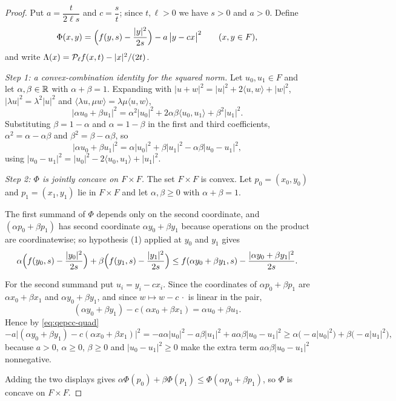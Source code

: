 \begin{proof}
Put $a=\dfrac{t}{2\ell s}$ and $c=\dfrac st$; since $t,\ell>0$ we have $s>0$ and $a>0$.
Define
\[
  \Phi(x,y)=\Bigl(f(y,s)-\frac{|y|^2}{2s}\Bigr)-a\,\bigl|y-cx\bigr|^2
  \qquad(x,y\in F),
\]
and write $\Lambda(x)=\mathcal{P}_\ell f(x,t)-|x|^2/(2t)$.

\emph{Step 1: a convex-combination identity for the squared norm.}
Let $u_0,u_1\in F$ and let $\alpha,\beta\in\mathbb{R}$ with $\alpha+\beta=1$. Expanding with
$|u+w|^2=|u|^2+2\langle u,w\rangle+|w|^2$, $|\lambda u|^2=\lambda^2|u|^2$ and
$\langle\lambda u,\mu w\rangle=\lambda\mu\langle u,w\rangle$,
\[
  |\alpha u_0+\beta u_1|^2
   =\alpha^2|u_0|^2+2\alpha\beta\langle u_0,u_1\rangle+\beta^2|u_1|^2 .
\]
Substituting $\beta=1-\alpha$ and $\alpha=1-\beta$ in the first and third coefficients,
$\alpha^2=\alpha-\alpha\beta$ and $\beta^2=\beta-\alpha\beta$, so
\begin{equation}\label{eq:qepcc-quad}
  |\alpha u_0+\beta u_1|^2
   =\alpha|u_0|^2+\beta|u_1|^2-\alpha\beta|u_0-u_1|^2 ,
\end{equation}
using $|u_0-u_1|^2=|u_0|^2-2\langle u_0,u_1\rangle+|u_1|^2$.

\emph{Step 2: $\Phi$ is jointly concave on $F\times F$.}
The set $F\times F$ is convex. Let $p_0=(x_0,y_0)$ and $p_1=(x_1,y_1)$ lie in $F\times F$
and let $\alpha,\beta\ge0$ with $\alpha+\beta=1$.

The first summand of $\Phi$ depends only on the second coordinate, and
$(\alpha p_0+\beta p_1)$ has second coordinate $\alpha y_0+\beta y_1$ because operations
on the product are coordinatewise; so hypothesis (1) applied at $y_0$ and $y_1$ gives
\[
  \alpha\Bigl(f(y_0,s)-\frac{|y_0|^2}{2s}\Bigr)+\beta\Bigl(f(y_1,s)-\frac{|y_1|^2}{2s}\Bigr)
   \le f(\alpha y_0+\beta y_1,s)-\frac{|\alpha y_0+\beta y_1|^2}{2s}.
\]

For the second summand put $u_i=y_i-cx_i$. Since the coordinates of
$\alpha p_0+\beta p_1$ are $\alpha x_0+\beta x_1$ and $\alpha y_0+\beta y_1$, and since
$w\mapsto w-c\,\cdot$ is linear in the pair,
\[
  (\alpha y_0+\beta y_1)-c(\alpha x_0+\beta x_1)=\alpha u_0+\beta u_1 .
\]
Hence by \eqref{eq:qepcc-quad}
\[
  -a\bigl|(\alpha y_0+\beta y_1)-c(\alpha x_0+\beta x_1)\bigr|^2
   =-a\alpha|u_0|^2-a\beta|u_1|^2+a\alpha\beta|u_0-u_1|^2
   \ge\alpha\bigl(-a|u_0|^2\bigr)+\beta\bigl(-a|u_1|^2\bigr),
\]
because $a>0$, $\alpha\ge0$, $\beta\ge0$ and $|u_0-u_1|^2\ge0$ make the extra term
$a\alpha\beta|u_0-u_1|^2$ nonnegative.

Adding the two displays gives
$\alpha\Phi(p_0)+\beta\Phi(p_1)\le\Phi(\alpha p_0+\beta p_1)$, so $\Phi$ is concave on
$F\times F$.


\end{proof}
